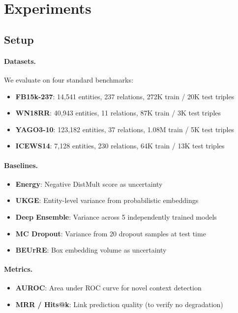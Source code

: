 \section{Experiments}
\label{sec:experiments}

\subsection{Setup}

\paragraph{Datasets.}
We evaluate on four standard benchmarks:
\begin{itemize}
    \item \textbf{FB15k-237}: 14,541 entities, 237 relations, 272K train / 20K test triples
    \item \textbf{WN18RR}: 40,943 entities, 11 relations, 87K train / 3K test triples
    \item \textbf{YAGO3-10}: 123,182 entities, 37 relations, 1.08M train / 5K test triples
    \item \textbf{ICEWS14}: 7,128 entities, 230 relations, 64K train / 13K test triples
\end{itemize}

\paragraph{Baselines.}
\begin{itemize}
    \item \textbf{Energy}: Negative DistMult score as uncertainty~\citep{liu2020energy}
    \item \textbf{UKGE}: Entity-level variance from probabilistic embeddings~\citep{chen2019embedding}
    \item \textbf{Deep Ensemble}: Variance across 5 independently trained models
    \item \textbf{MC Dropout}: Variance from 20 dropout samples at test time
    \item \textbf{BEUrRE}: Box embedding volume as uncertainty~\citep{chen2021probabilistic}
\end{itemize}

\paragraph{Metrics.}
\begin{itemize}
    \item \textbf{AUROC}: Area under ROC curve for novel context detection
    \item \textbf{MRR / Hits@k}: Link prediction quality (to verify no degradation)
\end{itemize}

